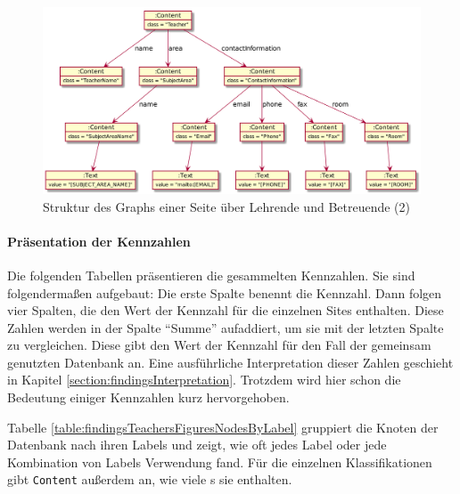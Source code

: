     \begin{figure}[htb]
        \centering
        \includegraphics[scale=\imageScalingFactor]{../resources/findings/case-study-1/dbmodel/dbmodel2.png}
        \caption{Struktur des Graphs einer Seite über Lehrende und Betreuende (2)}
        \label{image:findingTeachersFiguresDbModel2}
    \end{figure}

    \paragraph{Präsentation der Kennzahlen}
    Die folgenden Tabellen präsentieren die gesammelten Kennzahlen.
    Sie sind folgendermaßen aufgebaut:
    Die erste Spalte benennt die Kennzahl.
    Dann folgen vier Spalten, die den Wert der Kennzahl für die einzelnen Sites enthalten.
    Diese Zahlen werden in der Spalte "`Summe"' aufaddiert,
    um sie mit der letzten Spalte zu vergleichen.
    Diese gibt den Wert der Kennzahl für den Fall der gemeinsam genutzten Datenbank an.
    Eine ausführliche Interpretation dieser Zahlen geschieht in Kapitel \ref{section:findingsInterpretation}.
    Trotzdem wird hier schon die Bedeutung einiger Kennzahlen kurz hervorgehoben.

    Tabelle \ref{table:findingsTeachersFiguresNodesByLabel}
    gruppiert die Knoten der Datenbank nach ihren Labels und zeigt,
    wie oft jedes Label oder jede Kombination von Labels Verwendung fand.   
    Für die einzelnen Klassifikationen gibt \texttt{Content} außerdem an,
    wie viele {\contentFeature}s sie enthalten.

